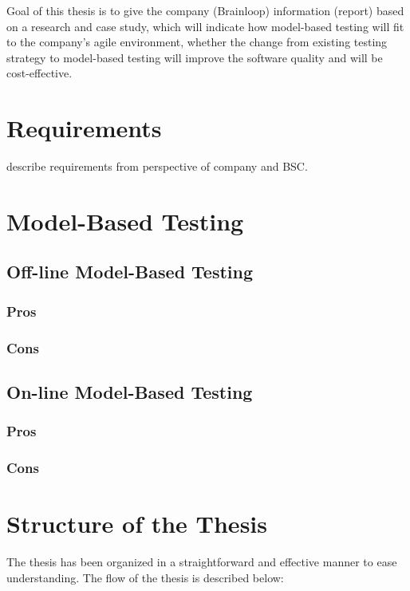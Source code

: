 Goal of this thesis is to give the company (Brainloop) information (report) based on a research and case study, which will indicate how model-based testing will fit to the company’s agile environment, whether the change from existing testing strategy to model-based testing will improve the software quality and will be cost-effective.

\section{Requirements}

describe requirements from perspective of company and BSC.

\section{Model-Based Testing}
\subsection{Off-line Model-Based Testing}
\subsubsection{Pros}
\subsubsection{Cons}
\subsection{On-line Model-Based Testing}
\subsubsection{Pros}
\subsubsection{Cons}

\section{Structure of the Thesis}
The thesis has been organized in a straightforward and effective manner to ease understanding. The flow of the thesis is described below:

